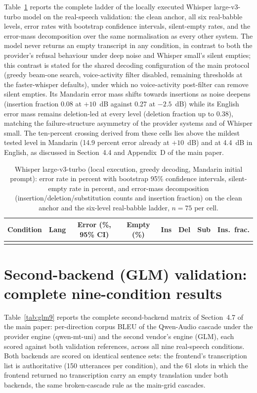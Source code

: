\documentclass[11pt]{article}
\begin{document}
Table~\ref{tab:whisperturbo} reports the complete ladder of the locally
executed Whisper large-v3-turbo model on the real-speech validation: the
clean anchor, all six real-babble levels, error rates with bootstrap
confidence intervals, silent-empty rates, and the error-mass decomposition
over the same normalisation as every other system. The model never returns
an empty transcript in any condition, in contrast to both the provider's
refusal behaviour under deep noise and Whisper small's silent empties; this
contrast is stated for the shared decoding configuration of the main
protocol (greedy beam-one search, voice-activity filter disabled, remaining
thresholds at the faster-whisper defaults), under which no voice-activity
post-filter can remove silent empties. Its
Mandarin error mass shifts towards insertions as noise deepens (insertion
fraction 0.08 at $+10$~dB against 0.27 at $-2.5$~dB) while its English
error mass remains deletion-led at every level (deletion fraction up to
0.38), matching the failure-structure asymmetry of the provider systems
and of Whisper small. The ten-percent crossing derived from these cells
lies above the mildest tested level in Mandarin (14.9 percent error
already at $+10$~dB) and at 4.4~dB in English, as discussed in
Section~4.4 and Appendix~D of the main paper.

\begin{table}[t]
\centering
\caption{Whisper large-v3-turbo (local execution, greedy decoding,
Mandarin initial prompt): error rate in percent with bootstrap 95\%
confidence intervals, silent-empty rate in percent, and error-mass
decomposition (insertion/deletion/substitution counts and insertion
fraction) on the clean anchor and the six-level real-babble ladder,
$n = 75$ per cell.}
\label{tab:whisperturbo}
\small
\setlength{\tabcolsep}{3.4pt}
\begin{tabular}{llcccccc}
\toprule
Condition & Lang & Error (\%, 95\% CI) & Empty (\%) & Ins & Del & Sub & Ins.\ frac. \\
\midrule
 \\
\bottomrule
\end{tabular}
\end{table}

\section{Second-backend (GLM) validation: complete nine-condition results}
\label{supp:glm9}

Table~\ref{tab:glm9} reports the complete second-backend matrix of
Section~4.7 of the main paper: per-direction corpus BLEU of the
Qwen-Audio cascade under the provider engine (qwen-mt-uni) and the
second vendor's engine (GLM), each scored against both validation
references, across all nine real-speech conditions. Both backends are
scored on identical sentence sets: the frontend's transcription list is
authoritative (150 utterances per condition), and the 61 slots in which
the frontend returned no transcription carry an empty translation under
both backends, the same broken-cascade rule as the main-grid cascades.
\end{document}
